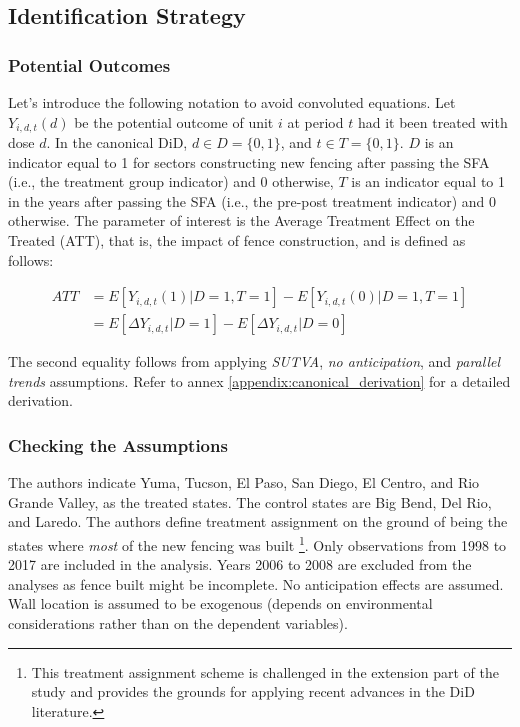 \documentclass[titlepage]{article}
\theoremstyle{plain}
\theoremstyle{plain}
\begin{document}
\subsection*{Identification Strategy}

\subsubsection*{Potential Outcomes}

Let's introduce the following notation to avoid convoluted equations. Let $Y_{i,d,t}(d)$ be the potential outcome of unit $i$ at period $t$ had it been treated with dose $d$. In the canonical DiD, $d \in D=\{0,1\}$, and $t \in T=\{0,1\}$. $D$ is an indicator equal to 1 for sectors constructing new fencing after passing the SFA (i.e., the treatment group indicator) and 0 otherwise, $T$ is an indicator equal to 1 in the years after passing the SFA (i.e., the pre-post treatment indicator) and 0 otherwise. The parameter of interest is the Average Treatment Effect on the Treated (ATT), that is, the impact of fence construction, and is defined as follows:

\begin{equation}
\label{eq:att_1}
\begin{split}
	\textit{ATT} &= E[Y_{i,d,t}(1)|D=1,T=1] - E[Y_{i,d,t}(0)|D=1,T=1]\\
	&= E[\Delta Y_{i,d,t}|D=1] - E[\Delta Y_{i,d,t}|D=0]
\end{split}
\end{equation}

The second equality follows from applying \textit{SUTVA}, \textit{no anticipation}, and \textit{parallel trends} assumptions. Refer to annex \ref{appendix:canonical_derivation} for a detailed derivation.

\subsubsection*{Checking the Assumptions}

The authors indicate Yuma, Tucson, El Paso, San Diego, El Centro, and Rio Grande Valley, as the treated states. The control states are Big Bend, Del Rio, and Laredo. The authors define treatment assignment on the ground of being the states where \textit{most} of the new fencing was built \footnote{This treatment assignment scheme is challenged in the extension part of the study and provides the grounds for applying recent advances in the DiD literature.}. Only observations from 1998 to 2017 are included in the analysis. Years 2006 to 2008 are excluded from the analyses as fence built might be incomplete. No anticipation effects are assumed. Wall location is assumed to be exogenous (depends on environmental considerations rather than on the dependent variables).
\end{document}
